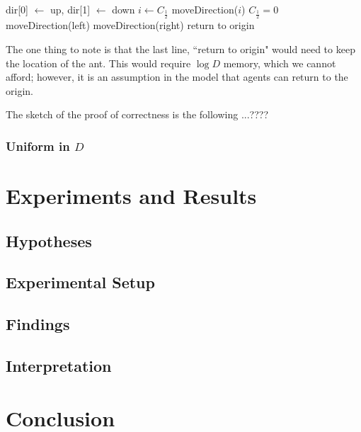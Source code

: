 \documentclass[runningheads,a4paper]{llncs}
\begin{document}
\begin{codebox}
\li dir[0] $\leftarrow$ up, dir[1] $\leftarrow$ down
\li $i \leftarrow C_{\frac{1}{2}}$
\li moveDirection($i$)
\li \If $C_{\frac{1}{2}} = 0$ \Then
\li moveDirection(left)
\li \Else moveDirection(right) \End \End
\li return to origin
\end{codebox}

The one thing to note is that the last line, ``return to origin" would need to keep the location of the ant. This would require $\log D$ memory, which we cannot afford; however, it is an assumption in the model that agents can return to the origin.

The sketch of the proof of correctness is the following ...????

\subsubsection{Uniform in $D$}

\section{Experiments and Results}
\label{experiments}

\subsection{Hypotheses}

\subsection{Experimental Setup}

\subsection{Findings}

\subsection{Interpretation}

\section{Conclusion}
\label{conclusion}



\end{document}
